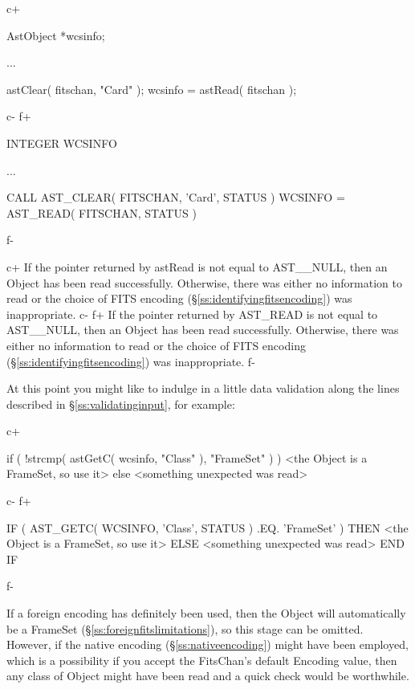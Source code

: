 \documentclass[twoside,11pt]{starlink}
\providecommand{\secref}[1]{\S\ref{#1}}
\begin{document}
c+
\small
\begin{terminalv}
AstObject *wcsinfo;

...

astClear( fitschan, "Card" );
wcsinfo = astRead( fitschan );
\end{terminalv}
\normalsize
c-
f+
\small
\begin{terminalv}
      INTEGER WCSINFO

      ...

      CALL AST_CLEAR( FITSCHAN, 'Card', STATUS )
      WCSINFO = AST_READ( FITSCHAN, STATUS )
\end{terminalv}
\normalsize
f-

c+
If the pointer returned by astRead is not equal to AST\_\_NULL, then
an Object has been read successfully. Otherwise, there was either no
information to read or the choice of FITS encoding
(\secref{ss:identifyingfitsencoding}) was inappropriate.
c-
f+
If the pointer returned by AST\_READ is not equal to AST\_\_NULL, then
an Object has been read successfully. Otherwise, there was either no
information to read or the choice of FITS encoding
(\secref{ss:identifyingfitsencoding}) was inappropriate.
f-

At this point you might like to indulge in a little data validation
along the lines described in \secref{ss:validatinginput}, for example:

c+
\small
\begin{terminalv}
if ( !strcmp( astGetC( wcsinfo, "Class" ), "FrameSet" ) ) {
   <the Object is a FrameSet, so use it>
} else {
   <something unexpected was read>
}
\end{terminalv}
\normalsize
c-
f+
\small
\begin{terminalv}
      IF ( AST_GETC( WCSINFO, 'Class', STATUS ) .EQ. 'FrameSet' ) THEN
         <the Object is a FrameSet, so use it>
      ELSE
         <something unexpected was read>
      END IF
\end{terminalv}
\normalsize
f-

If a foreign encoding has definitely been used, then the Object will
automatically be a FrameSet (\secref{ss:foreignfitslimitations}), so
this stage can be omitted. However, if the native encoding
(\secref{ss:nativeencoding}) might have been employed, which is a
possibility if you accept the FitsChan's default Encoding value, then
any class of Object might have been read and a quick check would be
worthwhile.
\end{document}
